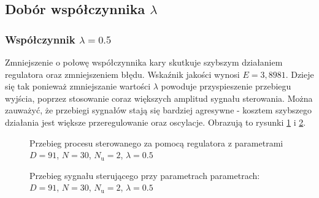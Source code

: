 \subsection{Dobór współczynnika $\lambda$}
\subsubsection{Współczynnik $\lambda = 0.5$}
Zmniejszenie o połowę współczynnika kary skutkuje szybszym działaniem regulatora oraz zmniejszeniem błędu. Wskaźnik jakości wynosi $E = 3,8981$. Dzieje się tak ponieważ zmniejszanie wartości $\lambda$ powoduje przyspieszenie przebiegu wyjścia, poprzez stosowanie coraz większych amplitud sygnału sterowania. Można zauważyć, że przebiegi sygnałów stają się bardziej agresywne - kosztem szybszego działania jest większe przeregulowanie oraz oscylacje. Obrazują to rysunki \ref{dmc_lam_0_5_y} i \ref{dmc_lam_0_5_u}.

\begin{figure}[t]
    \centering
    \caption{Przebieg procesu sterowanego za pomocą regulatora z parametrami $D = 91$, $N = 30$, $N_{\mathrm{u}} = 2$, $\lambda = 0.5$}
    \label{dmc_lam_0_5_y}
\end{figure}

\begin{figure}[b]
    \centering
    \caption{Przebieg sygnału sterującego przy parametrach parametrach: $D = 91$, $N = 30$, $N_{\mathrm{u}} = 2$, $\lambda = 0.5$}
    \label{dmc_lam_0_5_u}
\end{figure}

